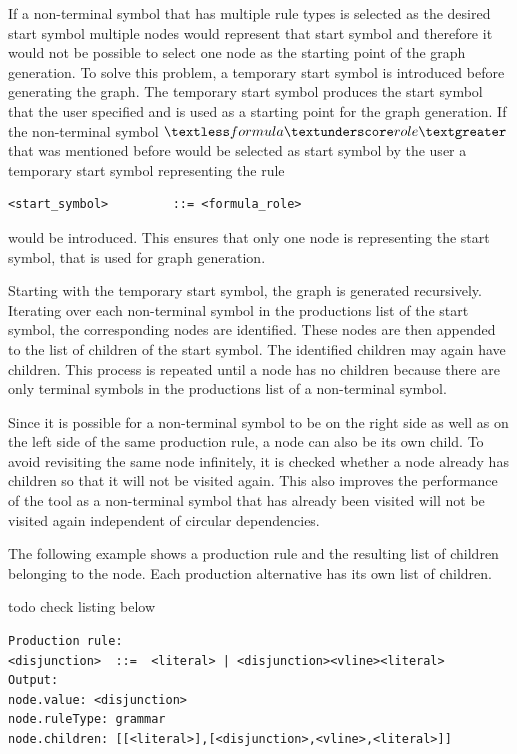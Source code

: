 If a non-terminal symbol that has multiple rule types is selected as the desired start symbol multiple nodes would represent that start symbol and therefore it would not be possible to select one node as the starting point of the graph generation.
To solve this problem, a temporary start symbol is introduced before generating the graph.
The temporary start symbol produces the start symbol that the user specified and is used as a starting point for the graph generation.
If the non-terminal symbol $\textless formula\textunderscore role\textgreater$ that was mentioned before would be selected as start symbol by the user a temporary start symbol representing the rule
\begin{lstlisting}[caption= Rule of the temporary start symbol]
<start_symbol>         ::= <formula_role>
\end{lstlisting}
would be introduced.
This ensures that only one node is representing the start symbol, that is used for graph generation.

Starting with the temporary start symbol, the graph is generated recursively. Iterating over each non-terminal symbol in the productions list of the start symbol, the corresponding nodes are identified. These nodes are then appended to the list of children of the start symbol. The identified children may again have children. This process is repeated until a node has no children because there are only terminal symbols in the productions list of a non-terminal symbol.

Since it is possible for a non-terminal symbol to be on the right side as well as on the left side of the same production rule, a node can also be its own child. To avoid revisiting the same node infinitely, it is checked whether a node already has children so that it will not be visited again. This also improves the performance of the tool as a non-terminal symbol that has already been visited will not be visited again independent of circular dependencies.

The following example shows a production rule and the resulting list of children belonging to the node. Each production alternative has its own list of children. %

todo check listing below
\begin{lstlisting}[caption= Rule and resulting list of children]
Production rule:
<disjunction>  ::=  <literal> | <disjunction><vline><literal>
Output:
node.value: <disjunction>
node.ruleType: grammar
node.children: [[<literal>],[<disjunction>,<vline>,<literal>]]
\end{lstlisting}

